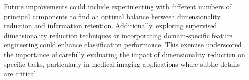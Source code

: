 \documentclass{article}
\begin{document}
Future improvements could include experimenting with different numbers of principal components to find an optimal balance between dimensionality reduction and information retention. Additionally, exploring supervised dimensionality reduction techniques or incorporating domain-specific feature engineering could enhance classification performance. This exercise underscored the importance of carefully evaluating the impact of dimensionality reduction on specific tasks, particularly in medical imaging applications where subtle details are critical.
\end{document}
